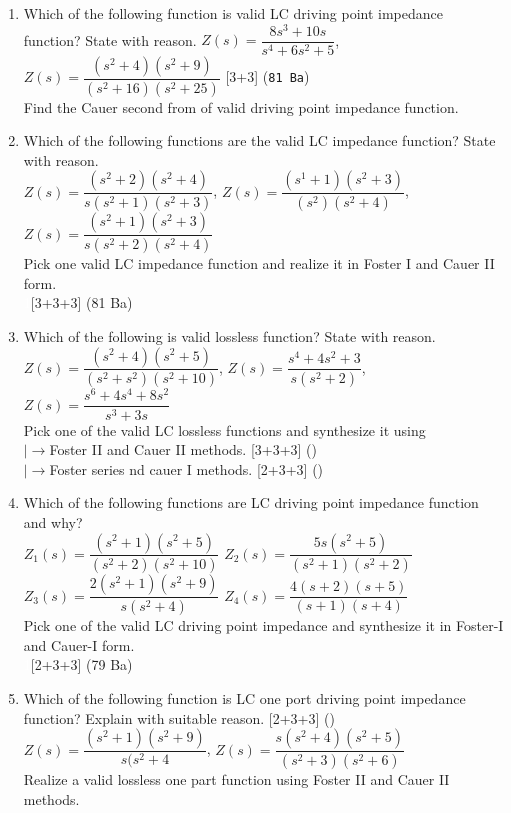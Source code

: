 \documentclass[12pt]{article}
\newcommand{\lb}{\\$\left|\rightarrow\right.$}
\newcommand{\enter}{\\\textcolor{white}{1}}
\begin{document}
\begin{enumerate}
				
				\item Which of the following function is valid LC driving point impedance function? State with reason.
				$Z(s) = \dfrac{8s^3+10s}{s^4+6s^2+5}$,\hspace*{1cm}    $Z(s) = \dfrac{(s^2+4)(s^2+9)}{(s^2+16)(s^2+25)}$ \hfill [3+3] (\texttt{81 Ba})\\
				Find the Cauer second from of valid driving point impedance function.
				
				\item Which of the following functions are the valid LC impedance function? State with reason.\\
				$Z(s) = \dfrac{(s^2+2)(s^2+4)}{s(s^2+1)(s^2+3)}$, \hspace{1cm} $Z(s) = \dfrac{(s^1+1)(s^2+3)}{(s^2)(s^2+4)}$, \hspace{1cm} $Z(s) = \dfrac{(s^2+1)(s^2+3)}{s(s^2+2)(s^2+4)}$\\
				Pick one valid LC impedance function and realize it in Foster I and Cauer II form. 
				\enter\hfill [3+3+3] (81 Ba)
				
				\item Which of the following is valid lossless function? State with reason. \\
				$Z(s) = \dfrac{(s^2+4)(s^2+5)}{(s^2+s^2)(s^2+10)}$, \hspace{1cm} $Z(s)= \dfrac{s^4+4s^2+3}{s(s^2+2)}$, \hspace{1cm} $Z(s) = \dfrac{s^6+4s^4+8s^2}{s^3+3s}$\\
				Pick one of the valid LC lossless functions and synthesize it using
				\lb Foster II and Cauer II methods. \hfill [3+3+3] ()
				\lb Foster series nd cauer I methods. \hfill [2+3+3] ()
				
				\item Which of the following functions are LC driving point impedance function and why?\\
				$Z_1 (s)=\dfrac{(s^2+1)(s^2+5)}{(s^2+2)(s^2+10)}$ \hspace{2cm}
				$Z_2 (s)=\dfrac{5s(s^2+5)}{(s^2+1)(s^2+2)}$\\[2pt]
				$Z_3 (s)=\dfrac{2(s^2+1)(s^2+9)}{s(s^2+4)}$ \hspace{2cm}
				$Z_4 (s)=\dfrac{4(s+2)(s+5)}{(s+1)(s+4)}$\\
				Pick one of the valid LC driving point impedance and synthesize it in Foster-I and Cauer-I form.
				\enter\hfill [2+3+3] (79 Ba)
				
				\item Which of the following function is LC one port driving point impedance function? Explain with suitable reason. \hfill [2+3+3] ()\\
				$Z(s) = \dfrac{(s^2+1)(s^2+9)}{s(s^2+4}$, \hspace{2cm}
				$Z(s) = \dfrac{s(s^2+4)(s^2+5)}{(s^2+3)(s^2+6)}$\\
				Realize a valid lossless one part function using Foster II and Cauer II methods.
				

\end{enumerate}
\end{document}
